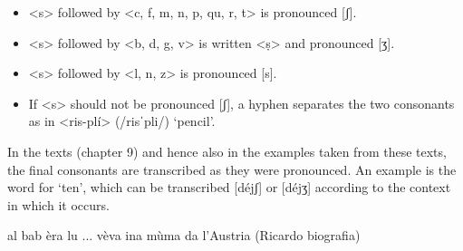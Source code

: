 \begin{itemize}

\item <s> followed by <c, f, m, n, p, qu, r, t> is pronounced [ʃ].
\item <s> followed by <b, d, g, v> is written <ṣ> and pronounced [ʒ].
\item <s> followed by <l, n, z> is pronounced [s].
\item If <s> should not be pronounced [ʃ], a hyphen separates the two consonants as in <ris-plí> (/risˈpli/) `pencil'.
\end{itemize}

In the texts (chapter 9) and hence also in the examples taken from these texts, the final consonants are transcribed as they were pronounced. An example is the word for `ten', which can be transcribed [déjʃ] or [déjʒ] according to the context in which it occurs.

al bab èra lu ... vèva ina mùma da l'Austria (Ricardo biografia)
